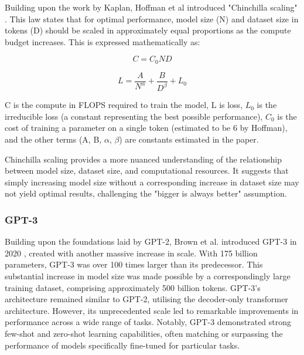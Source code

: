 \documentclass[a4paper, oneside]{discothesis}
\begin{document}
Building upon the work by Kaplan, Hoffman et al introduced "Chinchilla scaling" \cite{hoffmann2022training}. This law states that for optimal performance, model size (N) and dataset size in tokens (D) should be scaled in approximately equal proportions as the compute budget increases. This is expressed mathematically as:

\begin{equation}
C = C_0ND
\end{equation}

\begin{equation}
L = \frac{A}{N^\alpha} + \frac{B}{D^\beta} + L_0
\end{equation}

C is the compute in FLOPS required to train the model, L is loss, $L_0$ is the irreducible loss (a constant representing the best possible performance), $C_0$ is the cost of training a parameter on a single token (estimated to be 6 by Hoffman), and the other terms (A, B, $\alpha$, $\beta$) are constants estimated in the paper.

Chinchilla scaling provides a more nuanced understanding of the relationship between model size, dataset size, and computational resources. It suggests that simply increasing model size without a corresponding increase in dataset size may not yield optimal results, challenging the "bigger is always better" assumption.

\subsubsection{GPT-3}
Building upon the foundations laid by GPT-2, Brown et al. introduced GPT-3 in 2020 \cite{brown2020language}, created with another massive increase in scale. With 175 billion parameters, GPT-3 was over 100 times larger than its predecessor. 
This substantial increase in model size was made possible by a correspondingly large training dataset, comprising approximately 500 billion tokens.
GPT-3's architecture remained similar to GPT-2, utilising the decoder-only transformer architecture. 
However, its unprecedented scale led to remarkable improvements in performance across a wide range of tasks. Notably, GPT-3 demonstrated strong few-shot and zero-shot learning capabilities, often matching or surpassing the performance of models specifically fine-tuned for particular tasks.
\end{document}
